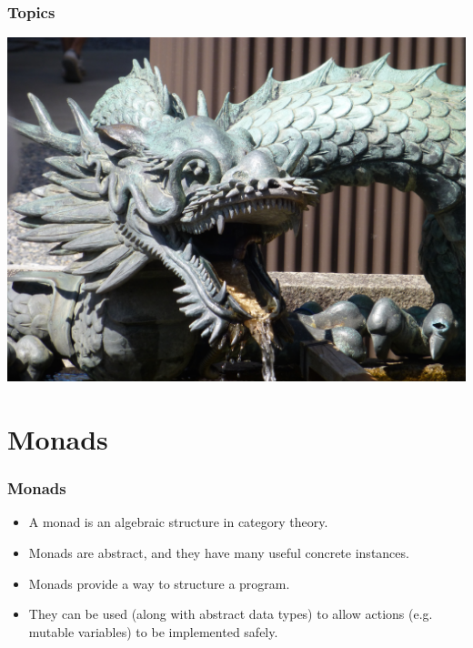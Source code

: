 \documentclass{beamer}
\begin{document}
\begin{frame}[fragile]
  \PresentationTitleSlide
\end{frame}

\begin{frame}[fragile]
  \frametitle{Topics}
  \tableofcontents
\end{frame}
\begin{frame}[fragile]
\begin{center}
\includegraphics[scale=0.075]
    {figures/jpg/pic09.jpg}
\end{center}
\end{frame}
\section{Monads}

\begin{frame}[fragile]
\frametitle{Monads}

\begin{itemize}
\item A monad is an algebraic structure in category theory.
\item Monads are abstract, and they have many useful concrete
  instances.
\item Monads provide a way to structure a program.
\item They can be used (along with abstract data types) to allow
  actions (e.g. mutable variables) to be implemented safely.
\end{itemize}

\end{frame}
\end{document}

